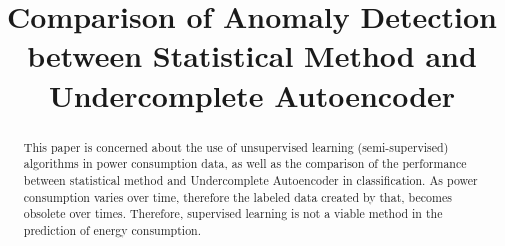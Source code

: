\documentclass[conference]{IEEEtran}
\begin{document}
\title{Comparison of Anomaly Detection between Statistical Method and Undercomplete Autoencoder\\
}

\author{
\and
{}
\and
{}

\and
\IEEEauthorblockN{}
\IEEEauthorblockA{\textit{ } \\
	\textit{ }\\
	}

\and


}

\maketitle

\begin{abstract}
This paper is concerned about the use of unsupervised learning (semi-supervised) algorithms in power consumption data, as well as the comparison of the performance between statistical method and Undercomplete Autoencoder in classification. As power consumption varies over time, therefore the labeled data created by that, becomes obsolete over times. Therefore, supervised learning is not a viable method in the prediction of energy consumption.

\end{abstract}
\end{document}
